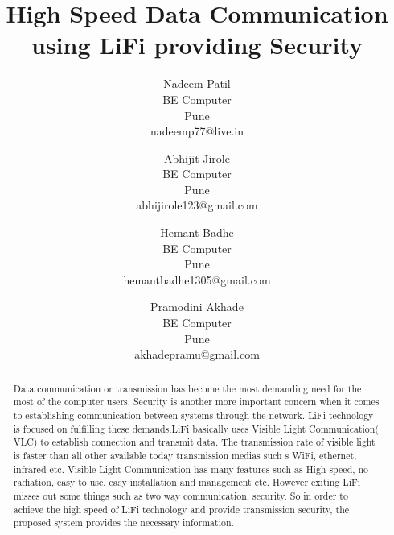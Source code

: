\documentclass{ijcaArticle}
\begin{document}
\title{High Speed Data Communication using LiFi providing Security} %

\author{ 
   \large Nadeem Patil \\[-3pt]
   \normalsize BE Computer  \\[-3pt]
    \normalsize Pune \\[-3pt]
    \normalsize	nadeemp77@live.in \\[-3pt]
  \and
   \large Abhijit Jirole \\[-3pt]
   \normalsize BE Computer  \\[-3pt]
    \normalsize Pune \\[-3pt]
    \normalsize	abhijirole123@gmail.com \\[-3pt]
\and
   \large Hemant Badhe \\[-3pt]
   \normalsize BE Computer  \\[-3pt]
    \normalsize Pune \\[-3pt]
    \normalsize	hemantbadhe1305@gmail.com \\[-3pt]
    \and
   \large Pramodini Akhade \\[-3pt]
   \normalsize BE Computer  \\[-3pt]
    \normalsize Pune \\[-3pt]
    \normalsize	akhadepramu@gmail.com \\[-3pt]
}


\maketitle



\begin{abstract} 
Data communication or transmission has become the most demanding need
for the most of the computer users. Security is another more important concern when it
comes to establishing communication between systems through the network. LiFi technology
is focused on fulfilling these demands.LiFi basically uses Visible Light Communication(
VLC) to establish connection and transmit data. The transmission rate of
visible light is faster than all other available today transmission medias such s WiFi,
ethernet, infrared etc. Visible Light Communication has many features such as High
speed, no radiation, easy to use, easy installation and management etc. However exiting
LiFi misses out some things such as two way communication, security. So in order to
achieve the high speed of LiFi technology and provide transmission security, the proposed
system provides the necessary information.
\end{abstract}
\end{document}
